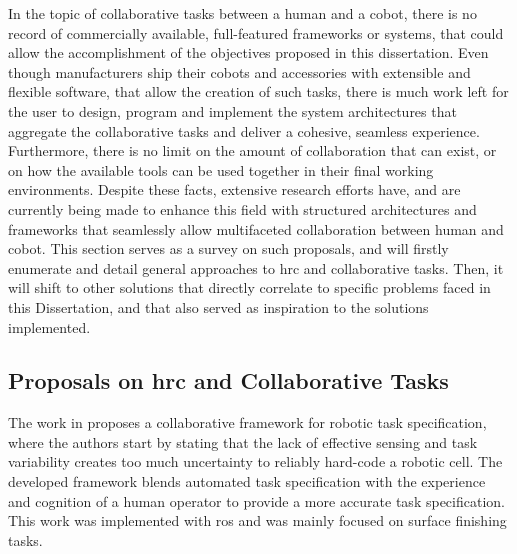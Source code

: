 \par In the topic of collaborative tasks between a human and a cobot, there is no record of  commercially available, full-featured frameworks or systems, that could allow the accomplishment of the objectives proposed in this dissertation. Even though manufacturers ship their cobots and accessories with extensible and flexible software, that allow the creation of such tasks, there is much work left for the user to design, program and implement the system architectures that aggregate the collaborative tasks and deliver a cohesive, seamless experience. Furthermore, there is no limit on the amount of collaboration that can exist, or on how the available tools can be used together in their final working environments.
Despite these facts, extensive research efforts have, and are currently being made \cite{paper.review.1, paper.review.2} to enhance this field with structured architectures and frameworks that seamlessly allow multifaceted collaboration between human and cobot. This section serves as a survey on such proposals, and will firstly enumerate and detail general approaches to \ac{hrc} and collaborative tasks. Then, it will shift to other solutions that directly correlate to specific problems faced in this Dissertation, and that also served as inspiration to the solutions implemented. 



\subsection{Proposals on \acs{hrc} and Collaborative Tasks}


\par The work in \cite{colab.framework} proposes a collaborative framework for robotic task specification, where the authors start by stating that the lack of effective sensing and task variability creates too much uncertainty to reliably hard-code a robotic cell. The developed framework blends automated task specification with the experience and cognition of a human operator to provide a more accurate task specification. This work was implemented with \ac{ros} and was mainly focused on surface finishing tasks.

